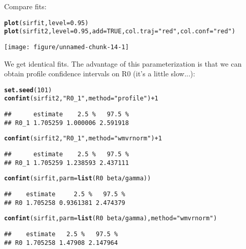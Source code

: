 \documentclass{article}\usepackage[]{graphicx}\usepackage[]{color}
\makeatletter
\def\maxwidth{ %
  \ifdim\Gin@nat@width>\linewidth
    \linewidth
  \else
    \Gin@nat@width
  \fi
}
\newcommand{\hlnum}[1]{\textcolor[rgb]{0.686,0.059,0.569}{#1}}%
\newcommand{\hlstr}[1]{\textcolor[rgb]{0.192,0.494,0.8}{#1}}%
\newcommand{\hlopt}[1]{\textcolor[rgb]{0,0,0}{#1}}%
\newcommand{\hlstd}[1]{\textcolor[rgb]{0.345,0.345,0.345}{#1}}%
\newcommand{\hlkwc}[1]{\textcolor[rgb]{0.333,0.667,0.333}{#1}}%
\newcommand{\hlkwd}[1]{\textcolor[rgb]{0.737,0.353,0.396}{\textbf{#1}}}%
\newenvironment{kframe}{%
 \def\at@end@of@kframe{}%
 \ifinner\ifhmode%
  \def\at@end@of@kframe{\end{minipage}}%
  \begin{minipage}{\columnwidth}%
 \fi\fi%
 \def\FrameCommand##1{\hskip\@totalleftmargin \hskip-\fboxsep
 \colorbox{shadecolor}{##1}\hskip-\fboxsep
     \hskip-\linewidth \hskip-\@totalleftmargin \hskip\columnwidth}%
 \MakeFramed {\advance\hsize-\width
   \@totalleftmargin\z@ \linewidth\hsize
   \@setminipage}}%
 {\par\unskip\endMakeFramed%
 \at@end@of@kframe}
\newenvironment{knitrout}{}{} %
\makeatother
\begin{document}
Compare fits:

\begin{knitrout}
\color{fgcolor}\begin{kframe}
\begin{alltt}
\hlkwd{plot}\hlstd{(sirfit,} \hlkwc{level}\hlstd{=}\hlnum{0.95}\hlstd{)}
\hlkwd{plot}\hlstd{(sirfit2,} \hlkwc{level}\hlstd{=}\hlnum{0.95}\hlstd{,} \hlkwc{add}\hlstd{=}\hlnum{TRUE}\hlstd{,} \hlkwc{col.traj}\hlstd{=}\hlstr{"red"}\hlstd{,} \hlkwc{col.conf}\hlstd{=}\hlstr{"red"}\hlstd{)}
\end{alltt}
\end{kframe}
\texttt{[image: figure/unnamed-chunk-14-1]} 

\end{knitrout}

We get identical fits. The advantage of this parameterization is that we can obtain profile confidence intervals on R0 (it's a little slow...):

\begin{knitrout}
\color{fgcolor}\begin{kframe}
\begin{alltt}
\hlkwd{set.seed}\hlstd{(}\hlnum{101}\hlstd{)}
\hlkwd{confint}\hlstd{(sirfit2,} \hlstr{"R0_1"}\hlstd{,} \hlkwc{method}\hlstd{=}\hlstr{"profile"}\hlstd{)} \hlopt{+} \hlnum{1}
\end{alltt}
\begin{verbatim}
##      estimate    2.5 %   97.5 %
## R0_1 1.705259 1.000006 2.591918
\end{verbatim}
\begin{alltt}
\hlkwd{confint}\hlstd{(sirfit2,} \hlstr{"R0_1"}\hlstd{,} \hlkwc{method}\hlstd{=}\hlstr{"wmvrnorm"}\hlstd{)} \hlopt{+} \hlnum{1}
\end{alltt}
\begin{verbatim}
##      estimate    2.5 %   97.5 %
## R0_1 1.705259 1.238593 2.437111
\end{verbatim}
\begin{alltt}
\hlkwd{confint}\hlstd{(sirfit,} \hlkwc{parm}\hlstd{=}\hlkwd{list}\hlstd{(R0}\hlopt{~}\hlstd{beta}\hlopt{/}\hlstd{gamma))}
\end{alltt}
\begin{verbatim}
##    estimate     2.5 %   97.5 %
## R0 1.705258 0.9361381 2.474379
\end{verbatim}
\begin{alltt}
\hlkwd{confint}\hlstd{(sirfit,} \hlkwc{parm}\hlstd{=}\hlkwd{list}\hlstd{(R0}\hlopt{~}\hlstd{beta}\hlopt{/}\hlstd{gamma),} \hlkwc{method}\hlstd{=}\hlstr{"wmvrnorm"}\hlstd{)}
\end{alltt}
\begin{verbatim}
##    estimate   2.5 %   97.5 %
## R0 1.705258 1.47908 2.147964
\end{verbatim}
\end{kframe}
\end{knitrout}
\end{document}
